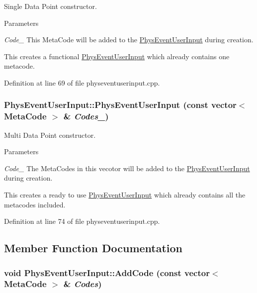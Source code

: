 Single Data Point constructor. 


\begin{DoxyParams}{Parameters}
\item[{\em Code\_\-}]This MetaCode will be added to the \hyperlink{classPhysEventUserInput}{PhysEventUserInput} during creation.\end{DoxyParams}
This creates a functional \hyperlink{classPhysEventUserInput}{PhysEventUserInput} which already contains one metacode. 

Definition at line 69 of file physeventuserinput.cpp.

\hypertarget{classPhysEventUserInput_a0a9bd99d8db6f171ef3c87bd417ccc4a}{
\subsubsection[{PhysEventUserInput}]{\setlength{\rightskip}{0pt plus 5cm}PhysEventUserInput::PhysEventUserInput (const vector$<$ {\bf MetaCode} $>$ \& {\em Codes\_\-})}}
\label{dc/d0e/classPhysEventUserInput_a0a9bd99d8db6f171ef3c87bd417ccc4a}


Multi Data Point constructor. 


\begin{DoxyParams}{Parameters}
\item[{\em Code\_\-}]The MetaCodes in this vecotor will be added to the \hyperlink{classPhysEventUserInput}{PhysEventUserInput} during creation.\end{DoxyParams}
This creates a ready to use \hyperlink{classPhysEventUserInput}{PhysEventUserInput} which already contains all the metacodes included. 

Definition at line 74 of file physeventuserinput.cpp.



\subsection{Member Function Documentation}
\hypertarget{classPhysEventUserInput_aecac02073d3296c71e0ae4534daf8dce}{
\subsubsection[{AddCode}]{\setlength{\rightskip}{0pt plus 5cm}void PhysEventUserInput::AddCode (const vector$<$ {\bf MetaCode} $>$ \& {\em Codes})}}
\label{dc/d0e/classPhysEventUserInput_aecac02073d3296c71e0ae4534daf8dce}


